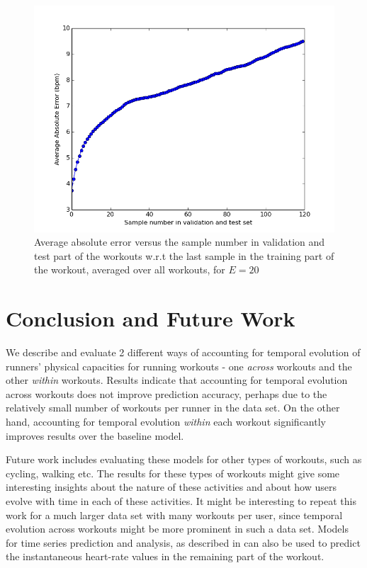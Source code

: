 \documentclass{acm_proc_article-sp}
\begin{document}
\begin{figure}[h]
\centering
\includegraphics[scale=0.4]{../src/plots/many_insthr_error_vs_sample_number}
\caption{\label{figManyInstHrErrorVsSampleNumberValTest} Average absolute error versus the sample number in validation and test part of the workouts w.r.t the last sample in the training part of the workout, averaged over all workouts, for $E = 20$}
\end{figure}

\section{Conclusion and Future Work}
\label{secConclusion}
We describe and evaluate 2 different ways of accounting for temporal evolution of runners' physical capacities for running workouts - one \emph{across} workouts and the other \emph{within} workouts. Results indicate that accounting for temporal evolution across workouts does not improve prediction accuracy, perhaps due to the relatively small number of workouts per runner in the data set. On the other hand, accounting for temporal evolution \emph{within} each workout significantly improves results over the baseline model.

Future work includes evaluating these models for other types of workouts, such as cycling, walking etc. The results for these types of workouts might give some interesting insights about the nature of these activities and about how users evolve with time in each of these activities. It might be interesting to repeat this work for a much larger data set with many workouts per user, since temporal evolution across workouts might be more prominent in such a data set. Models for time series prediction and analysis, as described in \cite{autoRegressiveModelWiki, timeSeriesStudy, timeSeriesSurvey} can also be used to predict the instantaneous heart-rate values in the remaining part of the workout.




\end{document}
